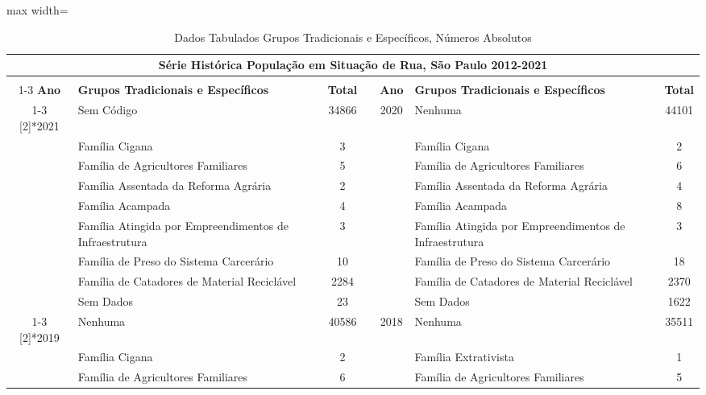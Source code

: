 \documentclass[14pt]{extarticle}
\begin{document}
\begin{table}[htbp]
  \centering
  \caption{Dados Tabulados Grupos Tradicionais e Específicos, Números Absolutos}
  \tabcolsep=0.20cm
	\renewcommand{\arraystretch}{1.5}
	\begin{adjustbox}{max width=\linewidth}
    \begin{tabular}{clcrclc}
    \toprule
    \multicolumn{7}{c}{Série Histórica População em Situação de Rua, São Paulo 2012-2021} \\
    \midrule
         &      &      &      &      &      &  \\
\cmidrule{1-3}\cmidrule{5-7}    \rowcolor[rgb]{ .906,  .902,  .902} \textbf{Ano} & \textbf{Grupos Tradicionais e Específicos} & \textbf{Total} & \cellcolor[rgb]{ 1,  1,  1} & \textbf{Ano} & \textbf{Grupos Tradicionais e Específicos} & \textbf{Total} \\
\cmidrule{1-3}\cmidrule{5-7}    \multirow{9}[2]{*}{2021} & Sem Código & 34866 &      & \multirow{9}[2]{*}{2020} & Nenhuma & 44101 \\
         & Família Cigana & 3    &      &      & Família Cigana & 2 \\
         & Família de Agricultores Familiares & 5    &      &      & Família de Agricultores Familiares & 6 \\
         & Família Assentada da Reforma Agrária & 2    &      &      & Família Assentada da Reforma Agrária & 4 \\
         & Família Acampada & 4    &      &      & Família Acampada & 8 \\
         & Família Atingida por Empreendimentos de Infraestrutura & 3    &      &      & Família Atingida por Empreendimentos de Infraestrutura & 3 \\
         & Família de Preso do Sistema Carcerário & 10    &      &      & Família de Preso do Sistema Carcerário & 18 \\
         & Família de Catadores de Material Reciclável & 2284 &      &      & Família de Catadores de Material Reciclável & 2370 \\
         & Sem Dados & 23   &      &      & Sem Dados & 1622 \\
\cmidrule{1-3}\cmidrule{5-7}    \multirow{9}[2]{*}{2019} & Nenhuma & 40586 &      & \multirow{9}[2]{*}{2018} & Nenhuma & 35511 \\
         & Família Cigana & 2    &      &      & Família Extrativista & 1 \\
         & Família de Agricultores Familiares & 6    &      &      & Família de Agricultores Familiares & 5 \\

\end{tabular}
\end{adjustbox}
\end{table}
\end{document}
